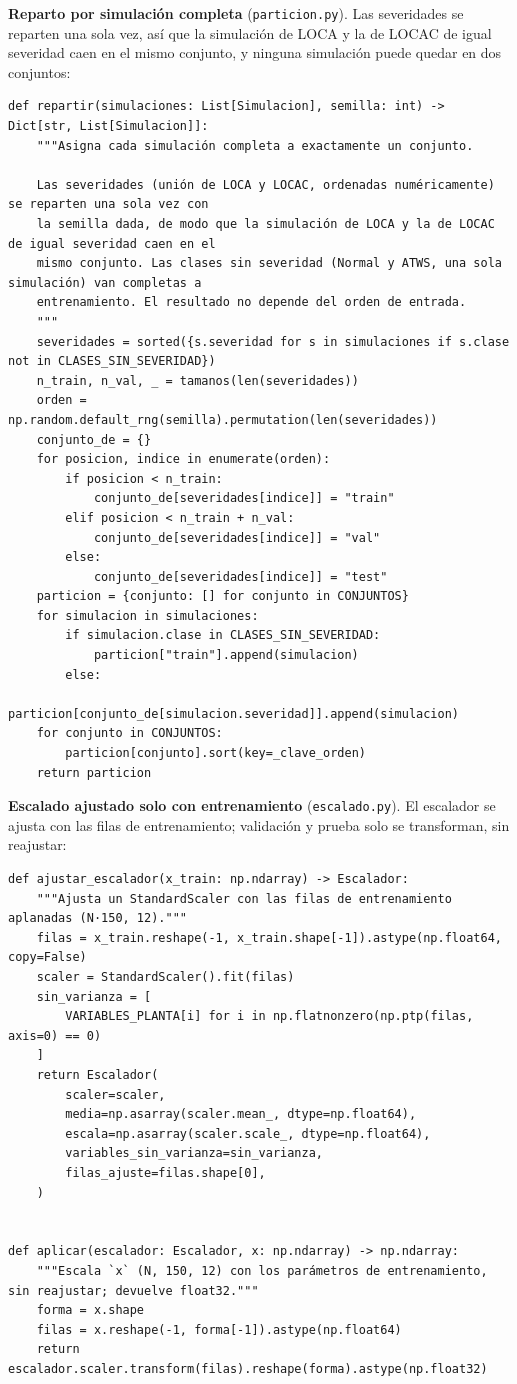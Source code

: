 \documentclass[12pt,a4paper]{article}
\begin{document}
\textbf{Reparto por simulación completa} (\texttt{particion.py}). Las severidades se reparten una sola vez, así que la simulación de LOCA y la de LOCAC de igual severidad caen en el mismo conjunto, y ninguna simulación puede quedar en dos conjuntos:
\begin{lstlisting}[firstnumber=29]
def repartir(simulaciones: List[Simulacion], semilla: int) -> Dict[str, List[Simulacion]]:
    """Asigna cada simulación completa a exactamente un conjunto.

    Las severidades (unión de LOCA y LOCAC, ordenadas numéricamente) se reparten una sola vez con
    la semilla dada, de modo que la simulación de LOCA y la de LOCAC de igual severidad caen en el
    mismo conjunto. Las clases sin severidad (Normal y ATWS, una sola simulación) van completas a
    entrenamiento. El resultado no depende del orden de entrada.
    """
    severidades = sorted({s.severidad for s in simulaciones if s.clase not in CLASES_SIN_SEVERIDAD})
    n_train, n_val, _ = tamanos(len(severidades))
    orden = np.random.default_rng(semilla).permutation(len(severidades))
    conjunto_de = {}
    for posicion, indice in enumerate(orden):
        if posicion < n_train:
            conjunto_de[severidades[indice]] = "train"
        elif posicion < n_train + n_val:
            conjunto_de[severidades[indice]] = "val"
        else:
            conjunto_de[severidades[indice]] = "test"
    particion = {conjunto: [] for conjunto in CONJUNTOS}
    for simulacion in simulaciones:
        if simulacion.clase in CLASES_SIN_SEVERIDAD:
            particion["train"].append(simulacion)
        else:
            particion[conjunto_de[simulacion.severidad]].append(simulacion)
    for conjunto in CONJUNTOS:
        particion[conjunto].sort(key=_clave_orden)
    return particion
\end{lstlisting}

\textbf{Escalado ajustado solo con entrenamiento} (\texttt{escalado.py}). El escalador se ajusta con las filas de entrenamiento; validación y prueba solo se transforman, sin reajustar:
\begin{lstlisting}[firstnumber=20]
def ajustar_escalador(x_train: np.ndarray) -> Escalador:
    """Ajusta un StandardScaler con las filas de entrenamiento aplanadas (N·150, 12)."""
    filas = x_train.reshape(-1, x_train.shape[-1]).astype(np.float64, copy=False)
    scaler = StandardScaler().fit(filas)
    sin_varianza = [
        VARIABLES_PLANTA[i] for i in np.flatnonzero(np.ptp(filas, axis=0) == 0)
    ]
    return Escalador(
        scaler=scaler,
        media=np.asarray(scaler.mean_, dtype=np.float64),
        escala=np.asarray(scaler.scale_, dtype=np.float64),
        variables_sin_varianza=sin_varianza,
        filas_ajuste=filas.shape[0],
    )


def aplicar(escalador: Escalador, x: np.ndarray) -> np.ndarray:
    """Escala `x` (N, 150, 12) con los parámetros de entrenamiento, sin reajustar; devuelve float32."""
    forma = x.shape
    filas = x.reshape(-1, forma[-1]).astype(np.float64)
    return escalador.scaler.transform(filas).reshape(forma).astype(np.float32)
\end{lstlisting}
\end{document}
